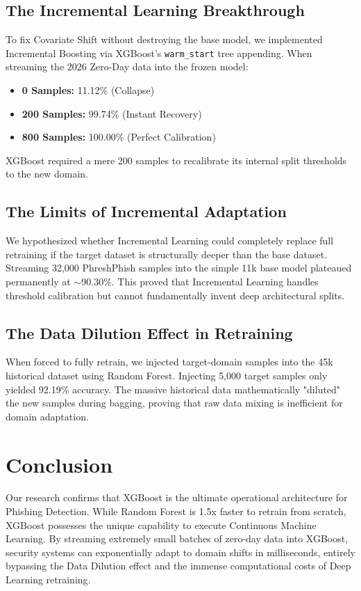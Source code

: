 \documentclass[10pt,twocolumn,letterpaper]{article}
\begin{document}
\subsection{The Incremental Learning Breakthrough}
To fix Covariate Shift without destroying the base model, we implemented Incremental Boosting via XGBoost's \texttt{warm\_start} tree appending. 
When streaming the 2026 Zero-Day data into the frozen model:
\begin{itemize}
    \item \textbf{0 Samples:} 11.12\% (Collapse)
    \item \textbf{200 Samples:} 99.74\% (Instant Recovery)
    \item \textbf{800 Samples:} 100.00\% (Perfect Calibration)
\end{itemize}
XGBoost required a mere 200 samples to recalibrate its internal split thresholds to the new domain.

\subsection{The Limits of Incremental Adaptation}
We hypothesized whether Incremental Learning could completely replace full retraining if the target dataset is structurally deeper than the base dataset. Streaming 32,000 PhreshPhish samples into the simple 11k base model plateaued permanently at $\sim$90.30\%. This proved that Incremental Learning handles threshold calibration but cannot fundamentally invent deep architectural splits.

\subsection{The Data Dilution Effect in Retraining}
When forced to fully retrain, we injected target-domain samples into the 45k historical dataset using Random Forest. Injecting 5,000 target samples only yielded 92.19\% accuracy. The massive historical data mathematically "diluted" the new samples during bagging, proving that raw data mixing is inefficient for domain adaptation.

\section{Conclusion}
Our research confirms that XGBoost is the ultimate operational architecture for Phishing Detection. While Random Forest is 1.5x faster to retrain from scratch, XGBoost possesses the unique capability to execute Continuous Machine Learning. By streaming extremely small batches of zero-day data into XGBoost, security systems can exponentially adapt to domain shifts in milliseconds, entirely bypassing the Data Dilution effect and the immense computational costs of Deep Learning retraining.
\end{document}
